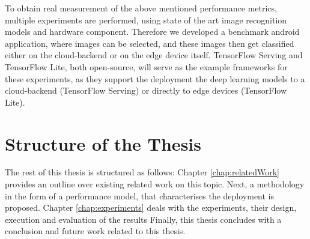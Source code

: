 To obtain real measurement of the above mentioned performance metrics, multiple experiments are performed, using state of the art image recognition models and hardware component. Therefore we developed a benchmark android application, where images can be selected, and these images then get classified either on the cloud-backend or on the edge device itself.
TensorFlow Serving and TensorFlow Lite, both open-source, will serve as the example frameworks for these experiments, as they support the deployment the deep learning models to a cloud-backend (TensorFlow Serving) or directly to edge devices (TensorFlow Lite).


\section{Structure of the Thesis}
The rest of this thesis is structured as follows: Chapter \ref{chap:relatedWork} provides an outline over existing related work on this topic. Next, a methodology in the form of a performance model, that characterises the deployment is proposed.
Chapter \ref{chap:experiments} deals with the experiments, their design, execution and evaluation of the results
Finally, this thesis concludes with a conclusion and future work related to this thesis.
